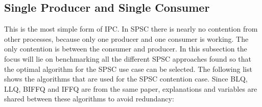 \subsection{Single Producer and Single Consumer}\label{subsec:single-producer-and-single-consumer}
This is the most simple form of \ac{IPC}. In \ac{SPSC} there is nearly no contention from other processes, because only one producer and one consumer is working. The only contention is between the consumer and producer. In this subsection the focus will lie on benchmarking all the different \ac{SPSC} approaches found so that the optimal algorithm for the \ac{SPSC} use case can be selected. The following list shows the algorithms that are used for the \ac{SPSC} contention case. Since \ac{BLQ}, \ac{LLQ}, \ac{BIFFQ} and \ac{IFFQ} are from the same paper, explanations and variables are shared between these algorithms to avoid redundancy:
